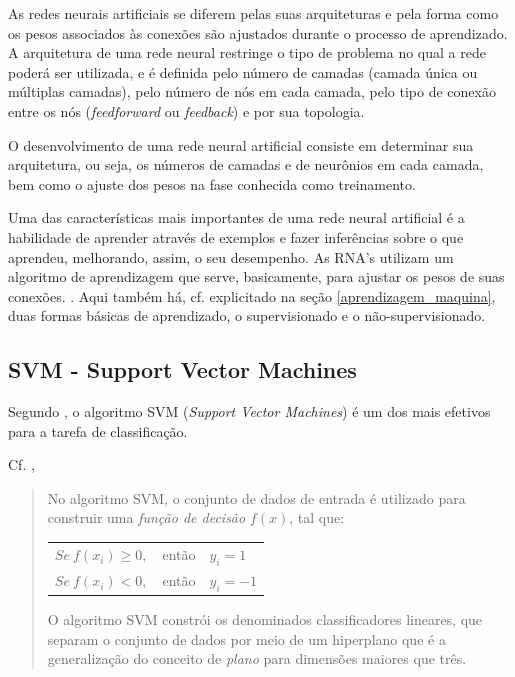 As  redes  neurais  artificiais  se  diferem  pelas  suas arquiteturas e pela forma como os pesos associados às conexões são ajustados durante o processo de aprendizado.	A arquitetura de uma rede neural restringe o tipo de problema no qual a rede poderá ser utilizada, e é definida pelo  número  de  camadas  (camada única  ou múltiplas camadas), pelo número de nós em cada camada, pelo tipo de conexão entre os nós (\textit{feedforward} ou \textit{feedback}) e por sua topologia. \cite[p. 46-49]{haykin_redes_2001}

O desenvolvimento de uma rede neural artificial consiste em determinar sua arquitetura, ou seja, os números de camadas e de neurônios em cada camada, bem como o ajuste dos pesos na fase conhecida como treinamento.\cite{hagan_neural_1996} \cite{haykin_redes_2001}

Uma das características mais importantes de uma rede neural artificial é a habilidade de aprender através de exemplos e fazer inferências sobre o que aprendeu, melhorando, assim, o seu desempenho. As RNA's utilizam um algoritmo de aprendizagem que serve, basicamente, para ajustar os pesos de suas conexões. \cite{haykin_redes_2001} \cite{ferneda_redes_2006} \cite{lima_ia_2016} \cite{Norvig2013}. Aqui também há, cf. explicitado na seção \ref{aprendizagem_maquina}, duas formas básicas de aprendizado, o supervisionado e o não-supervisionado.

\subsection{SVM - Support Vector Machines}\label{SVM}
Segundo \cite{cortes_svm_1995}, o algoritmo SVM (\textit{Support Vector Machines}) é um dos mais efetivos para a tarefa de classificação.

Cf. \cite{goldschmidt2005},
\begin{quotation}
	No algoritmo SVM, o conjunto de dados de entrada é utilizado para construir uma \textit{função de decisão} $f(x)$, tal que:
	
	\begin{table}[h!]
		\centering
		\begin{tabular}{lll}			
			$ Se \ f(x_i) \geq 0,  $ & então   & $ y_i = 1 $  \\
			$ Se \ f(x_i) < 0, $ & então & $ y_i = -1 $  
		\end{tabular}
	\end{table}
	
	O algoritmo SVM constrói os denominados classificadores lineares, que separam o conjunto de dados por meio de um hiperplano que é a generalização do conceito de \textit{plano} para dimensões maiores que três.	
\end{quotation}

